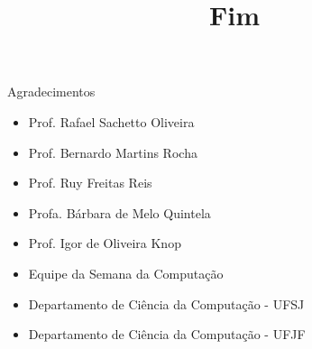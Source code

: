 \documentclass[12pt,t,graphics]{beamer}
\newcommand{\bi}{\begin{itemize}}
\newcommand{\ei}{\end{itemize}}
\begin{document}
\begin{frame}[t]{Agradecimentos}
	\bi
	\item Prof. Rafael Sachetto Oliveira
	\item Prof. Bernardo Martins Rocha
	\item Prof. Ruy Freitas Reis
	\item Profa. Bárbara de Melo Quintela
	\item Prof. Igor de Oliveira Knop
	\item Equipe da Semana da Computação
	\item Departamento de Ciência da Computação - UFSJ
	\item Departamento de Ciência da Computação - UFJF
	\ei
\end{frame}


\begin{frame}
	\title{Fim}
	\date{}\author{}\subtitle{}\institute{}\date{}
	\maketitle
\end{frame}

\end{document}
